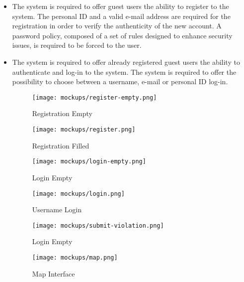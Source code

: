 	\begin{itemize}
		\item The system is required to offer guest users the ability to register to the system. The personal ID and a valid e-mail address are required for the registration in order to verify the authenticity of the new account. A password policy, composed of a set of rules designed to enhance security issues, is required to be forced to the user.
				
		\item The system is required to offer already registered guest users the ability to authenticate and log-in to the system. The system is required to offer the possibility to choose between a username, e-mail or personal ID log-in. \newline\newline
			
			\begin{figure}[h]
  				\centering
  				\begin{minipage}[b]{0.4\textwidth}
    				\texttt{[image: mockups/register-empty.png]}
    					\caption{Registration Empty}
  				\end{minipage}
  				\hfill
  				\begin{minipage}[b]{0.4\textwidth}
    				\texttt{[image: mockups/register.png]}
    				\caption{Registration Filled}
  				\end{minipage}
			\end{figure}
		
			\begin{figure}[h]
  				\centering
  				\begin{minipage}[b]{0.4\textwidth}
    				\texttt{[image: mockups/login-empty.png]}
    					\caption{Login Empty}
  				\end{minipage}
  				\hfill
  				\begin{minipage}[b]{0.4\textwidth}
    				\texttt{[image: mockups/login.png]}
    				\caption{Username Login}
  				\end{minipage}
			\end{figure}
			
			\begin{figure}[h]
  				\centering
  				\begin{minipage}[b]{0.4\textwidth}
    				\texttt{[image: mockups/submit-violation.png]}
    					\caption{Login Empty}
  				\end{minipage}
  				\hfill
  				\begin{minipage}[b]{0.4\textwidth}
    				\texttt{[image: mockups/map.png]}
    				\caption{Map Interface}
  				\end{minipage}
			\end{figure}
	\end{itemize}



